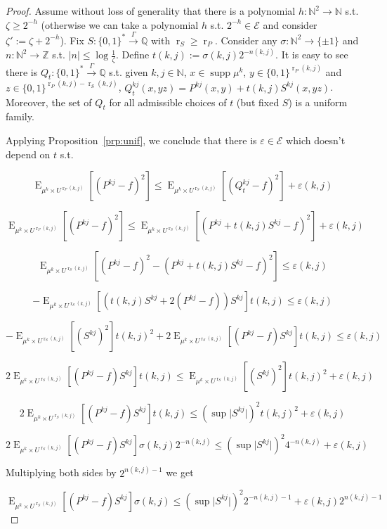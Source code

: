 \documentclass{article}
\theoremstyle{definition}
\theoremstyle{plain}
\newcommand{\Words}{{\{ 0, 1 \}^*}}
\newcommand{\WordsLen}[1]{{\{ 0, 1 \}^{#1}}}
\DeclareMathOperator{\Supp}{supp}
\DeclareMathOperator{\E}{E}
\DeclareMathOperator{\R}{r}
\newcommand{\Nats}{\mathbb{N}}
\newcommand{\Ints}{\mathbb{Z}}
\newcommand{\Rats}{\mathbb{Q}}
\newcommand{\Abs}[1]{\lvert #1 \rvert}
\begin{document}
\begin{proof}

Assume without loss of generality that there is a polynomial ${h: \Nats^2 \rightarrow \Nats}$ s.t. $\zeta \geq 2^{-h}$ (otherwise we can take a polynomial $h$ s.t. $2^{-h} \in \mathcal{E}$ and consider $\zeta':=\zeta+2^{-h}$). Fix $S: \Words \xrightarrow{\Gamma} \Rats$ with $\R_S \geq \R_P$. Consider any ${\sigma: \Nats^2 \rightarrow \{ \pm 1 \}}$ and $n: \Nats^2 \rightarrow \Ints$ s.t. $\Abs{n} \leq \log \frac{1}{\zeta}$. Define ${t(k,j) := \sigma(k,j) 2^{-n(k,j)}}$. It is easy to see there is $Q_t: \Words \xrightarrow{\Gamma} \Rats$ s.t. given $k,j \in \Nats$, $x \in \Supp \mu^k$, ${y \in \WordsLen{\R_P(k,j)}}$ and $z \in \WordsLen{\R_P(k,j) - \R_S(k,j)}$, $Q_t^{kj}(x,yz) = P^{kj}(x,y) + t(k,j) S^{kj}(x,yz)$. Moreover, the set of $Q_t$ for all admissible choices of $t$ (but fixed $S$) is a uniform family.

Applying Proposition~\ref{prp:unif}, we conclude that there is $\varepsilon \in \mathcal{E}$ which doesn't depend on $t$ s.t.

$$\E_{\mu^k \times U^{\R_P(k,j)}}[(P^{kj} - f)^2] \leq \E_{\mu^k \times U^{\R_S(k,j)}}[(Q_t^{kj} - f)^2] + \varepsilon(k,j)$$

$$\E_{\mu^k \times U^{\R_P(k,j)}}[(P^{kj} - f)^2] \leq \E_{\mu^k \times U^{\R_S(k,j)}}[(P^{kj} + t(k,j)S^{kj}  - f)^2] + \varepsilon(k,j)$$

$$\E_{\mu^k \times U^{\R_S(k,j)}}[(P^{kj} - f)^2 - (P^{kj} + t(k,j)S^{kj} - f)^2] \leq \varepsilon(k,j)$$

$$-\E_{\mu^k \times U^{\R_S(k,j)}}[(t(k,j)S^{kj} + 2 (P^{kj} - f)) S^{kj}] t(k,j) \leq \varepsilon(k,j)$$

$$-\E_{\mu^k \times U^{\R_S(k,j)}}[(S^{kj})^2] t(k,j)^2 + 2 \E_{\mu^k \times U^{\R_S(k,j)}}[(P^{kj} - f) S^{kj}] t(k,j) \leq \varepsilon(k,j)$$

$$2 \E_{\mu^k \times U^{\R_S(k,j)}}[(P^{kj} - f) S^{kj}] t(k,j) \leq \E_{\mu^k \times U^{\R_S(k,j)}}[(S^{kj})^2] t(k,j)^2 + \varepsilon(k,j)$$

$$2 \E_{\mu^k \times U^{\R_S(k,j)}}[(P^{kj} - f) S^{kj}] t(k,j) \leq (\sup \Abs{S^{kj}})^2 t(k,j)^2 + \varepsilon(k,j)$$

$$2 \E_{\mu^k \times U^{\R_S(k,j)}}[(P^{kj} - f) S^{kj}] \sigma(k,j) 2^{-n(k,j)} \leq (\sup \Abs{S^{kj}})^2 4^{-n(k,j)} + \varepsilon(k,j)$$

Multiplying both sides by $2^{n(k,j)-1}$ we get

$$\E_{\mu^k \times U^{\R_S(k,j)}}[(P^{kj} - f) S^{kj}] \sigma(k,j) \leq (\sup \Abs{S^{kj}})^2 2^{-n(k,j)-1} + \varepsilon(k,j) 2^{n(k,j)-1}$$


\end{proof}
\end{document}
